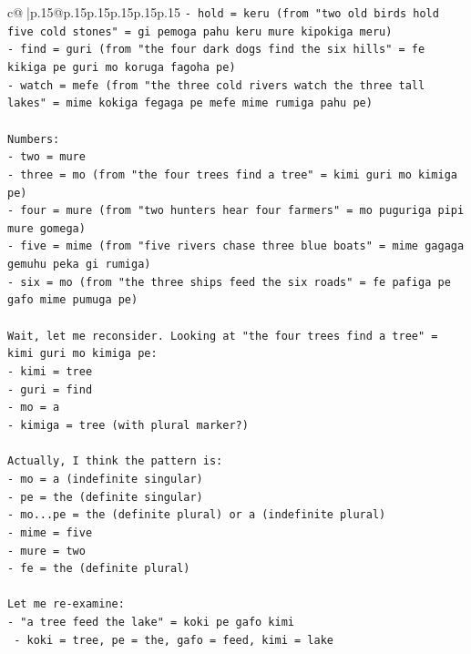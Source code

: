 \documentclass{article}
\begin{document}
{\begin{supertabular}{c@{$\;$}|p{.15\linewidth}@{}p{.15\linewidth}p{.15\linewidth}p{.15\linewidth}p{.15\linewidth}p{.15\linewidth}}
{{{\texttt{{-} hold = keru (from "two old birds hold five cold stones" = gi pemoga pahu keru mure kipokiga meru)} \\
\texttt{{-} find = guri (from "the four dark dogs find the six hills" = fe kikiga pe guri mo koruga fagoha pe)} \\
\texttt{{-} watch = mefe (from "the three cold rivers watch the three tall lakes" = mime kokiga fegaga pe mefe mime rumiga pahu pe)} \\
\\ 
\texttt{Numbers:} \\
\texttt{{-} two = mure} \\
\texttt{{-} three = mo (from "the four trees find a tree" = kimi guri mo kimiga pe)} \\
\texttt{{-} four = mure (from "two hunters hear four farmers" = mo puguriga pipi mure gomega)} \\
\texttt{{-} five = mime (from "five rivers chase three blue boats" = mime gagaga gemuhu peka gi rumiga)} \\
\texttt{{-} six = mo (from "the three ships feed the six roads" = fe pafiga pe gafo mime pumuga pe)} \\
\\ 
\texttt{Wait, let me reconsider. Looking at "the four trees find a tree" = kimi guri mo kimiga pe:} \\
\texttt{{-} kimi = tree} \\
\texttt{{-} guri = find} \\
\texttt{{-} mo = a} \\
\texttt{{-} kimiga = tree (with plural marker?)} \\
\\ 
\texttt{Actually, I think the pattern is:} \\
\texttt{{-} mo = a (indefinite singular)} \\
\texttt{{-} pe = the (definite singular)} \\
\texttt{{-} mo...pe = the (definite plural) or a (indefinite plural)} \\
\texttt{{-} mime = five} \\
\texttt{{-} mure = two} \\
\texttt{{-} fe = the (definite plural)} \\
\\ 
\texttt{Let me re{-}examine:} \\
\texttt{{-} "a tree feed the lake" = koki pe gafo kimi} \\
\texttt{  {-} koki = tree, pe = the, gafo = feed, kimi = lake} \\
}}}
\end{supertabular}}
\end{document}
